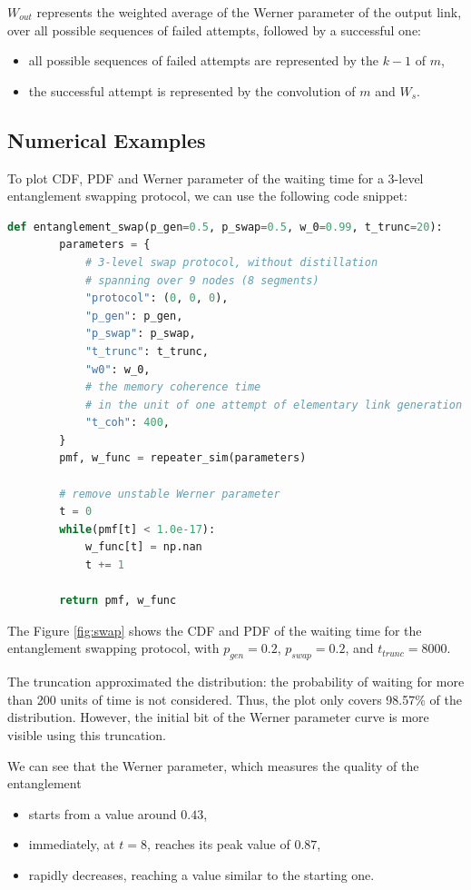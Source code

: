 \documentclass{masterthesis}
\begin{document}
$W_{out}$ represents the weighted average of the Werner parameter of the output link, over all possible sequences of failed attempts, followed by a successful one:
\begin{itemize}
    \item all possible sequences of failed attempts are represented by the $k-1$ of $m$,
    \item the successful attempt is represented by the convolution of $m$ and $W_{s}$.
\end{itemize}

\subsection*{Numerical Examples}

To plot CDF, PDF and Werner parameter of the waiting time for a 3-level entanglement swapping protocol, we can use the following code snippet:
\begin{lstlisting}[language=Python]
    def entanglement_swap(p_gen=0.5, p_swap=0.5, w_0=0.99, t_trunc=20):
        parameters = {
            # 3-level swap protocol, without distillation
            # spanning over 9 nodes (8 segments)
            "protocol": (0, 0, 0),
            "p_gen": p_gen,
            "p_swap": p_swap,
            "t_trunc": t_trunc,
            "w0": w_0,
            # the memory coherence time 
            # in the unit of one attempt of elementary link generation
            "t_coh": 400,
        }
        pmf, w_func = repeater_sim(parameters)
        
        # remove unstable Werner parameter
        t = 0
        while(pmf[t] < 1.0e-17):
            w_func[t] = np.nan
            t += 1

        return pmf, w_func
\end{lstlisting}

The Figure \ref{fig:swap} shows the CDF and PDF of the waiting time for the entanglement swapping protocol, with $p_{gen} = 0.2$, $p_{swap} = 0.2$, and $t_{trunc} = 8000$. 

The truncation approximated the distribution: the probability of waiting for more than 200 units of time is not considered. Thus, the plot only covers 98.57\% of the distribution. However, the initial bit of the Werner parameter curve is more visible using this truncation.

We can see that the Werner parameter, which measures the quality of the entanglement
\begin{itemize}
    \item starts from a value around $0.43$,
    \item immediately, at $t = 8$, reaches its peak value of $0.87$,
    \item rapidly decreases, reaching a value similar to the starting one.
\end{itemize}
\end{document}
